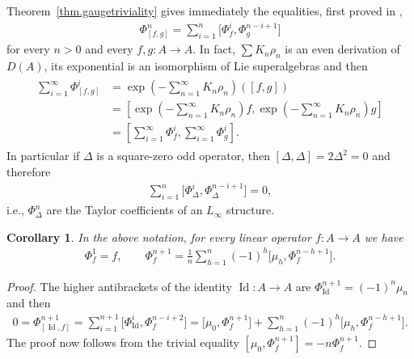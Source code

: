 \documentclass[pdftex]{sigma}
\numberwithin{equation}{section}
\newtheorem{Corollary}[Theorem]{Corollary}
\begin{document}
Theorem~\ref{thm.gaugetriviality} gives immediately the equalities, f\/irst proved in \cite{BDA},
\begin{gather*}
\Phi_{[f,g]}^{n}=\sum_{i=1}^n\big[\Phi^i_f,\Phi^{n-i+1}_g\big]
\end{gather*}
for every $n>0$ and every $f,g\colon A\to A$.
In fact, $\sum K_n\rho_n$ is an even derivation of $D(A)$, its exponential is an isomorphism of Lie superalgebras and then
\begin{gather*} \begin{split}
\sum_{i=1}^{\infty}\Phi_{[f,g]}^i&=\exp\left(-\sum_{n=1}^{\infty}K_n\rho_n\right)([f,g])\\
&=\left[\exp\left(-\sum_{n=1}^{\infty}K_n\rho_n\right)f,\exp\left(-\sum_{n=1}^{\infty}K_n\rho_n\right)g\right]\\
&=\left[\sum_{i=1}^{\infty}\Phi_{f}^i,\sum_{i=1}^{\infty}\Phi_{g}^i\right] .\end{split}\end{gather*}
In particular if $\Delta$ is a square-zero odd operator, then
$[\Delta,\Delta]=2\Delta^2=0$ and therefore
\begin{gather*} \sum_{i=1}^n\big[\Phi^i_\Delta,\Phi^{n-i+1}_\Delta\big]=0,\end{gather*}
i.e., $\Phi^n_\Delta$ are the Taylor coef\/f\/icients of an $L_{\infty}$ structure.

\begin{Corollary}\label{cor.recursivebis}
In the above notation, for every linear operator $f\colon A\to A$ we have
\begin{gather*} \Phi^1_f=f,\qquad \Phi^{n+1}_f=\frac{1}{n}\sum_{h=1}^n(-1)^{h}\big[\mu_h,\Phi^{n-h+1}_f\big].\end{gather*}
\end{Corollary}

\begin{proof} The higher antibrackets of the identity $\operatorname{Id}\colon A\to A$
are $\Phi^{n+1}_{\operatorname{Id}}=(-1)^n\mu_{n}$ and then
\begin{gather*} 0=\Phi^{n+1}_{[\operatorname{Id},f]}=\sum_{i=1}^{n+1}\big[\Phi^i_{\operatorname{Id}},\Phi^{n-i+2}_f\big]=
\big[\mu_0,\Phi^{n+1}_f\big]+\sum_{h=1}^{n}(-1)^h\big[\mu_h,\Phi^{n-h+1}_f\big] .\end{gather*}
The proof now follows from the trivial equality
$[\mu_0,\Phi^{n+1}_f]=-n\Phi^{n+1}_f$.
\end{proof}
\end{document}
